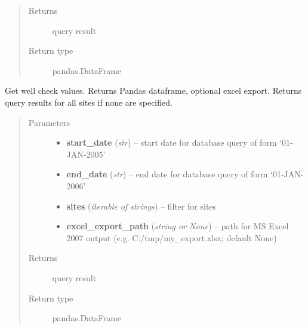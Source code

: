 \documentclass[letterpaper,10pt,english]{sphinxmanual}
\begin{document}
\begin{fulllineitems}
\begin{fulllineitems}
\begin{quote}
\begin{description}
\item[{Returns}] \leavevmode
query result

\item[{Return type}] \leavevmode
pandas.DataFrame

\end{description}\end{quote}

\end{fulllineitems}


\begin{fulllineitems}
\label{modules:webb_utils.retrieve_data.RetrieveData.get_well_check_values}
Get well check values. Returns Pandas dataframe, optional excel export.
Returns query results for all sites if none are specified.
\begin{quote}\begin{description}
\item[{Parameters}] \leavevmode\begin{itemize}
\item {} 
\textbf{start\_date} (\emph{str}) -- start date for database query of form `01-JAN-2005'

\item {} 
\textbf{end\_date} (\emph{str}) -- end date for database query of form `01-JAN-2006'

\item {} 
\textbf{sites} (\emph{iterable of strings}) -- filter for sites

\item {} 
\textbf{excel\_export\_path} (\emph{string or None}) -- path for MS Excel 2007 output (e.g. C:/tmp/my\_export.xlsx; default None)

\end{itemize}

\item[{Returns}] \leavevmode
query result

\item[{Return type}] \leavevmode
pandas.DataFrame

\end{description}\end{quote}

\end{fulllineitems}


\end{fulllineitems}
\end{document}
